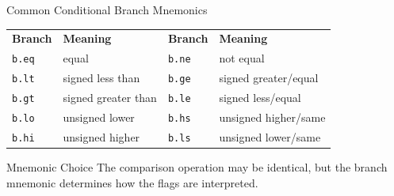\documentclass[aspectratio=169,11pt,t]{beamer}
\newcommand{\code}[1]{\texttt{#1}}
\begin{document}



\begin{frame}{Common Conditional Branch Mnemonics}
\begin{center}
\small
\renewcommand{\arraystretch}{1.12}
\begin{tabular}{
  >{\raggedright\arraybackslash}m{2.0cm}
  >{\raggedright\arraybackslash}m{3.0cm}
  >{\raggedright\arraybackslash}m{2.0cm}
  >{\raggedright\arraybackslash}m{3.3cm}
}
\rowcolor{navy}
{\color{white}\bfseries Branch} &
{\color{white}\bfseries Meaning} &
{\color{white}\bfseries Branch} &
{\color{white}\bfseries Meaning} \\
\rowcolor{softgray}
\code{b.eq} & equal &
\code{b.ne} & not equal \\
\rowcolor{white}
\code{b.lt} & signed less than &
\code{b.ge} & signed greater/equal \\
\rowcolor{softgray}
\code{b.gt} & signed greater than &
\code{b.le} & signed less/equal \\
\rowcolor{white}
\code{b.lo} & unsigned lower &
\code{b.hs} & unsigned higher/same \\
\rowcolor{softgray}
\code{b.hi} & unsigned higher &
\code{b.ls} & unsigned lower/same \\
\end{tabular}
\end{center}
\vspace{0.2cm}
\begin{block}{Mnemonic Choice}
The comparison operation may be identical, but the branch mnemonic determines how the flags are interpreted.
\end{block}
\end{frame}



\end{document}
